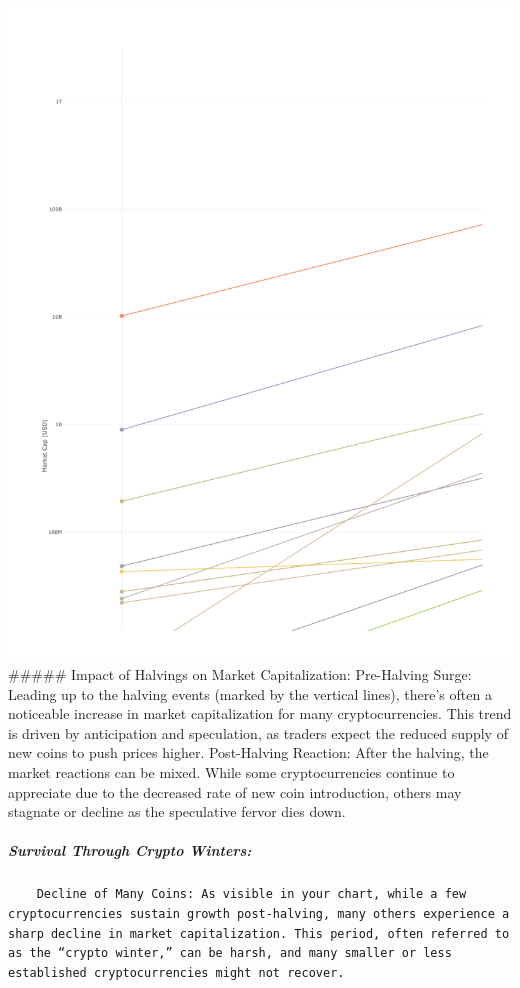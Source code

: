 \documentclass[
]{article}
\begin{document}
\includegraphics{Crypto_ETL_files/figure-latex/top_crypto_data-1.pdf}
\#\#\#\#\# Impact of Halvings on Market Capitalization: Pre-Halving
Surge: Leading up to the halving events (marked by the vertical lines),
there's often a noticeable increase in market capitalization for many
cryptocurrencies. This trend is driven by anticipation and speculation,
as traders expect the reduced supply of new coins to push prices higher.
Post-Halving Reaction: After the halving, the market reactions can be
mixed. While some cryptocurrencies continue to appreciate due to the
decreased rate of new coin introduction, others may stagnate or decline
as the speculative fervor dies down.

\hypertarget{survival-through-crypto-winters}{%
\subparagraph{Survival Through Crypto
Winters:}\label{survival-through-crypto-winters}}

\begin{verbatim}
    Decline of Many Coins: As visible in your chart, while a few cryptocurrencies sustain growth post-halving, many others experience a sharp decline in market capitalization. This period, often referred to as the “crypto winter,” can be harsh, and many smaller or less established cryptocurrencies might not recover.
\end{verbatim}
\end{document}
